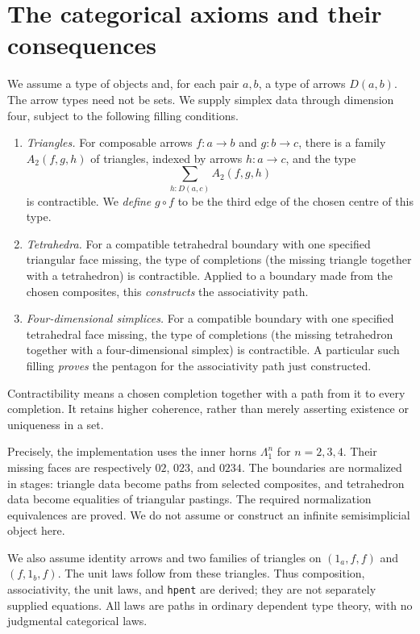 \documentclass[11pt]{amsart}
\newcommand{\code}[1]{\nolinkurl{#1}}
\begin{document}
\section{The categorical axioms and their consequences}
We assume a type of objects and, for each pair $a,b$, a type of arrows
$D(a,b)$. The arrow types need not be sets. We supply simplex data through
dimension four, subject to the following filling conditions.
\begin{enumerate}
\item \emph{Triangles.} For composable arrows $f:a\to b$ and $g:b\to c$,
there is a family $A_2(f,g,h)$ of triangles, indexed by arrows $h:a\to c$,
and the type
\[
 \sum_{h:D(a,c)} A_2(f,g,h)
\]
is contractible. We \emph{define} $g\circ f$ to be the third edge of the
chosen centre of this type.
\item \emph{Tetrahedra.} For a compatible tetrahedral boundary with one
specified triangular face missing, the type of completions (the missing
triangle together with a tetrahedron) is contractible. Applied to a
boundary made from the chosen composites, this \emph{constructs} the
associativity path.
\item \emph{Four-dimensional simplices.} For a compatible boundary with
one specified tetrahedral face missing, the type of completions (the
missing tetrahedron together with a four-dimensional simplex) is
contractible. A particular such filling \emph{proves} the pentagon for
the associativity path just constructed.
\end{enumerate}
Contractibility means a chosen completion together with a path from it
to every completion. It retains higher coherence, rather than merely
asserting existence or uniqueness in a set.

Precisely, the implementation uses the inner horns $\Lambda^n_1$ for
$n=2,3,4$. Their missing faces are respectively $02$, $023$, and $0234$.
The boundaries are normalized in stages: triangle data become paths
from selected composites, and tetrahedron data become equalities of
triangular pastings. The required normalization equivalences are proved.
We do not assume or construct an infinite semisimplicial object here.

We also assume identity arrows and two families of triangles on
$(1_a,f,f)$ and $(f,1_b,f)$. The unit laws follow from these triangles.
Thus composition, associativity, the unit laws, and \code{hpent} are
derived; they are not separately supplied equations. All laws are paths
in ordinary dependent type theory, with no judgmental categorical laws.
\end{document}
